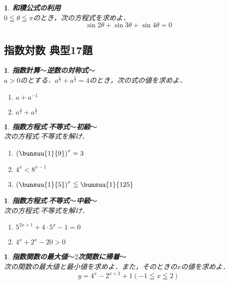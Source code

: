 \documentclass[10pt,
fleqn,
dvipdfmx,
uplatex
]{jsarticle}
\newtheorem{question}[Question]{}
\begin{document}
\begin{question}{\bf\boldmath 和積公式の利用}\\
$0\leqq \theta \leqq \pi$のとき，次の方程式を求めよ．
\[\sin 2\theta +\sin 3\theta +\sin 4\theta =0\]
\end{question}

\subsection{指数対数 典型17題}



\begin{question}{\bf\boldmath 指数計算$〜$逆数の対称式$〜$}\\
$a>0$のとする．$a^{\frac{1}{3}}+a^{\frac{1}{3}}=4$のとき，次の式の値を求めよ．
\begin{enumerate}
\item $a+a^{-1}$
\item $a^{\frac{1}{2}}+a^{\frac{1}{2}}$
\end{enumerate}

\end{question}



\begin{question}{\bf\boldmath 指数方程式$\cdot$不等式$〜$初級$〜$}\\
次の方程式$\cdot$不等式を解け．
\begin{enumerate}
\item $\left(\bunsuu{1}{9}\right)^x=3$
\item $4^x<8^{x-1}$
\item $\left(\bunsuu{1}{5}\right)^x\leqq \bunsuu{1}{{{125}}}$
\end{enumerate}

\end{question}



\begin{question}{\bf\boldmath 指数方程式$\cdot$不等式$〜$中級$〜$}\\
次の方程式$\cdot$不等式を解け．
\begin{enumerate}
\item $5^{2x+1}+4\cdot 5^x-1=0$
\item $4^x+2^x-{20}>0$
\end{enumerate}

\end{question}



\begin{question}{\bf\boldmath 指数関数の最大値$〜2$次関数に帰着$〜$}\\
次の関数の最大値と最小値を求めよ．また，そのときの$x$の値を求めよ．
\[y=4^x-2^{x+2}+1\left(-1\leqq x\leqq 2\right)\]
\end{question}
\end{document}
